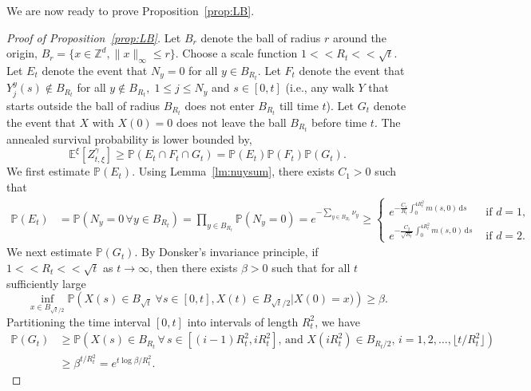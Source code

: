 \documentclass{article}[12pt]
\theoremstyle{definition}
\newcommand{\Z}{\mathbb{Z}}
\newcommand{\1}{\mathbbm{1}}
\newcommand{\dd }{\mathrm{d} }
\begin{document}
We are now ready to prove Proposition~\ref{prop:LB}.
\begin{proof}[Proof of Proposition~\ref{prop:LB}]
Let $B_r$ denote the ball of radius $r$ around the origin, $B_r = \{x\in \Z^d, \lVert x \rVert_\infty \le r\}$. Choose a scale function $1<< R_t << \sqrt{t}$. Let $E_t$ denote the event that $N_y = 0$ for all $y\in B_{R_t}$. Let $F_t$ denote the event that $Y^y_j(s)\not\in B_{R_t}$ for all $y\not\in B_{R_t}, \; 1\le j\le N_y$ and $s \in [0,t]$ (i.e., any walk $Y$ that starts outside the ball of radius $B_{R_t}$ does not enter $B_{R_t}$ till time $t$). Let $G_t$ denote the event that $X$ with $X(0)=0$ does not leave the ball $B_{R_t}$ before time $t$. The annealed survival probability is lower bounded by,
\begin{equation}
    \mathbb{E}^\xi[Z^\gamma_{t, \xi}] \ge \mathbb{P}(E_t \cap F_t \cap G_t) = \mathbb{P}(E_t)\mathbb{P}(F_t)\mathbb{P}(G_t).
    \label{eq12}
\end{equation}
We first estimate $\mathbb{P}(E_t)$. Using Lemma~\ref{lm:nuysum}, there exists $C_1>0$ such that
\begin{align}
    \mathbb{P}(E_t) &= \mathbb{P}(N_y = 0 \, \forall y\in B_{R_t}) = \prod_{y\in B_{R_t}}\mathbb{P}(N_y = 0) = e^{-\sum_{y\in B_{R_t}}\nu_y} \ge  \begin{cases} e^{-\frac{C_1}{R_t}\int_0^{4R_t^2}m(s,0)\, \dd s} & \text{ if } d=1,\\
   e^{- \frac{C_2}{\sqrt{R_t}} \int_0^{4R_t^2} m(s,0)\, \dd s}  & \text{ if }d=2.
   \end{cases}
     \label{eqn:ET}
\end{align}
We next estimate $\mathbb{P}(G_t)$.
By Donsker's invariance principle, if $1<<R_t<<\sqrt{t}$ as $t\to \infty$, then there exists $\beta >0$ such that for all $t$ sufficiently large
\begin{equation}
    \inf_{x\in B_{\sqrt{t}/2}} \mathbb{P}\left(X(s)\in B_{\sqrt{t}} \; \forall s\in [0,t], X(t) \in B_{\sqrt{t}/2}|X(0) = x)\right) \ge \beta.
\end{equation}
Partitioning the time interval $[0,t]$ into intervals of length $R_t^2$, we have
\begin{align}
    \mathbb{P}(G_t) &\geq \mathbb{P}\left(X(s) \in B_{R_t} \, \forall \, s \in [(i-1)R_t^2, iR_t^2], \, \text{and } X(iR_t^2) \in B_{R_t/2}, \, i = 1, 2, \dots, \lfloor t / R_t^2 \rfloor \right) \nonumber\\
& \geq \beta^{t / R_t^2} = e^{t \log \beta / R_t^2}.
\label{eqn:GT}

\end{align}
\end{proof}
\end{document}
